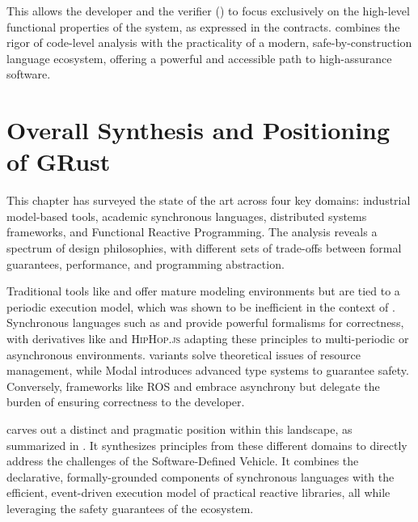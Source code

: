 This allows the developer and the verifier (\Creusot) to focus exclusively on the high-level
functional properties of the system, as expressed in the contracts. \GReusot combines the rigor of
code-level analysis with the practicality of a modern, safe-by-construction language ecosystem,
offering a powerful and accessible path to high-assurance software.

\section{Overall Synthesis and Positioning of GRust}
\label{sec:sota:overall_synthesis}

This chapter has surveyed the state of the art across four key domains: industrial model-based
tools, academic synchronous languages, distributed systems frameworks, and Functional Reactive
Programming. The analysis reveals a spectrum of design philosophies, with different sets of
trade-offs between formal guarantees, performance, and programming abstraction.

Traditional tools like \Simulink and \Scade offer mature modeling environments but are tied to a
periodic execution model, which was shown to be inefficient in the context of \sdv. Synchronous
languages such as \Lustre and \Esterel provide powerful formalisms for correctness, with derivatives
like \Prelude and \textsc{HipHop.js} adapting these principles to multi-periodic or asynchronous
environments. \frp variants solve theoretical issues of resource management, while Modal \frp
introduces advanced type systems to guarantee safety. Conversely, frameworks like ROS and \ReactiveX
embrace asynchrony but delegate the burden of ensuring correctness to the developer.

\GRust carves out a distinct and pragmatic position within this landscape, as summarized in
. It synthesizes principles from these different domains to
directly address the challenges of the Software-Defined Vehicle. It combines the declarative,
formally-grounded components of synchronous languages with the efficient, event-driven execution
model of practical reactive libraries, all while leveraging the safety guarantees of the \Rust
ecosystem.

